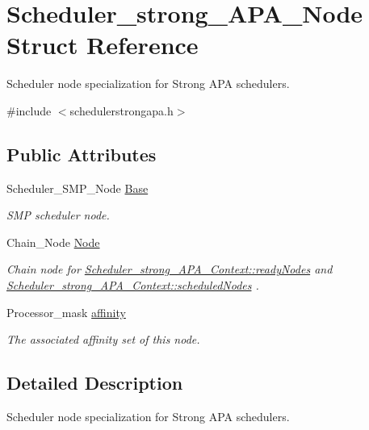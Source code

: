 \hypertarget{structScheduler__strong__APA__Node}{}\section{Scheduler\+\_\+strong\+\_\+\+A\+P\+A\+\_\+\+Node Struct Reference}
\label{structScheduler__strong__APA__Node}


Scheduler node specialization for Strong A\+PA schedulers.  




{\ttfamily \#include $<$schedulerstrongapa.\+h$>$}

\subsection*{Public Attributes}
\begin{DoxyCompactItemize}
\item 
Scheduler\+\_\+\+S\+M\+P\+\_\+\+Node \hyperlink{structScheduler__strong__APA__Node_ae86cbf5fd8743267abe33bed6d8b0fe6}{Base}
\begin{DoxyCompactList}\small\item\em S\+MP scheduler node. \end{DoxyCompactList}\item 
Chain\+\_\+\+Node \hyperlink{structScheduler__strong__APA__Node_aed93ad80a3757ffbbe0a0d1b5426b3cc}{Node}
\begin{DoxyCompactList}\small\item\em Chain node for \hyperlink{structScheduler__strong__APA__Context_a5b31ff1b54bde351d53a41abee3e91ed}{Scheduler\+\_\+strong\+\_\+\+A\+P\+A\+\_\+\+Context\+::ready\+Nodes} and \hyperlink{structScheduler__strong__APA__Context_a144c4296c745b8d5bfa5e3a00fe14e81}{Scheduler\+\_\+strong\+\_\+\+A\+P\+A\+\_\+\+Context\+::scheduled\+Nodes} . \end{DoxyCompactList}\item 
Processor\+\_\+mask \hyperlink{structScheduler__strong__APA__Node_a2e8928b11f1738a11c228780eb849989}{affinity}
\begin{DoxyCompactList}\small\item\em The associated affinity set of this node. \end{DoxyCompactList}\end{DoxyCompactItemize}


\subsection{Detailed Description}
Scheduler node specialization for Strong A\+PA schedulers. 

